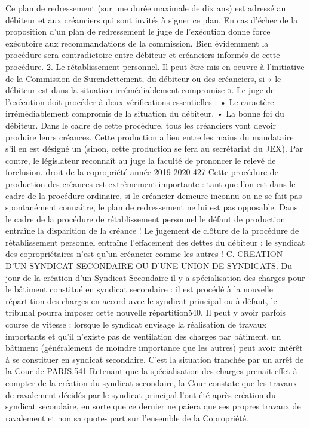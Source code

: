 Ce plan de redressement (sur une durée maximale de dix ans) est adressé au débiteur et aux créanciers qui sont invités à signer ce plan.
En cas d’échec de la proposition d’un plan de redressement le juge de l’exécution donne force exécutoire aux recommandations de la commission. Bien évidemment la procédure sera contradictoire entre débiteur et créanciers informés de cette procédure.
2. Le rétablissement personnel.
Il peut être mis en oeuvre à l’initiative de la Commission de Surendettement, du débiteur ou des créanciers, si « le débiteur est dans la situation irrémédiablement compromise ».
Le juge de l'exécution doit procéder à deux vérifications essentielles :
• Le caractère irrémédiablement compromis de la situation du débiteur,
• La bonne foi du débiteur.
Dans le cadre de cette procédure, tous les créanciers vont devoir produire leurs créances.
Cette production a lieu entre les mains du mandataire s’il en est désigné un (sinon, cette production se fera au secrétariat du JEX). Par contre, le législateur reconnaît au juge la faculté de prononcer le relevé de forclusion.
droit de la copropriété année 2019-2020
427
Cette procédure de production des créances est extrêmement importante : tant que l'on est dans le cadre de la procédure ordinaire, si le créancier demeure inconnu ou ne se fait pas spontanément connaître, le plan de redressement ne lui est pas opposable. Dans le cadre de la procédure de rétablissement personnel le défaut de production entraîne la disparition de la créance !
Le jugement de clôture de la procédure de rétablissement personnel entraîne l'effacement des dettes du débiteur : le syndicat des copropriétaires n’est qu’un créancier comme les autres !
C. CREATION D'UN SYNDICAT SECONDAIRE OU D’UNE UNION DE SYNDICATS.
Du jour de la création d'un Syndicat Secondaire il y a spécialisation des charges pour le bâtiment constitué en syndicat secondaire : il est procédé à la nouvelle répartition des charges en accord avec le syndicat principal ou à défaut, le tribunal pourra imposer cette nouvelle répartition540.
Il peut y avoir parfois course de vitesse : lorsque le syndicat envisage la réalisation de travaux importants et qu'il n'existe pas de ventilation des charges par bâtiment, un bâtiment (généralement de moindre importance que les autres) peut avoir intérêt à se constituer en syndicat secondaire. C'est la situation tranchée par un arrêt de la Cour de PARIS.541 Retenant que la spécialisation des charges prenait effet à compter de la création du syndicat secondaire, la Cour constate que les travaux de ravalement décidés par le syndicat principal l'ont été après création du syndicat secondaire, en sorte que ce dernier ne paiera que ses propres travaux de ravalement et non sa quote- part sur l'ensemble de la Copropriété.
